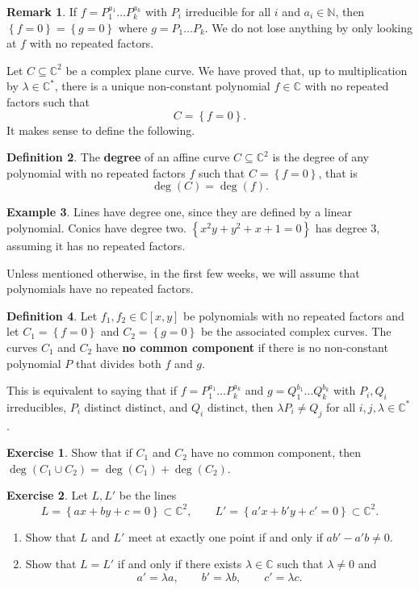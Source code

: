 \documentclass{article}
\newcommand{\N}{\mathbb{N}}
\newcommand{\C}{\mathbb{C}}
\newcommand{\rb}[1]{\left( #1 \right)}
\renewcommand{\sb}[1]{\left[ #1 \right]}
\newcommand{\cb}[1]{\left\{ #1 \right\}}
\theoremstyle{definition}\newtheorem{definition}{Definition}[section]
\theoremstyle{definition}\newtheorem{notation}[definition]{Notation}
\theoremstyle{definition}\newtheorem{remark}[definition]{Remark}
\theoremstyle{definition}\newtheorem{example}[definition]{Example}
\theoremstyle{definition}\newtheorem{fact}{Fact}
\theoremstyle{definition}\newtheorem{exercise}{Exercise}
\begin{document}
\begin{remark}
If $ f = P_1^{a_1} \dots P_k^{a_k} $ with $ P_i $ irreducible for all $ i $ and $ a_i \in \N $, then $ \cb{f = 0} = \cb{g = 0} $ where $ g = P_1 \dots P_k $. We do not lose anything by only looking at $ f $ with no repeated factors.
\end{remark}

Let $ C \subseteq \C^2 $ be a complex plane curve. We have proved that, up to multiplication by $ \lambda \in \C^* $, there is a unique non-constant polynomial $ f \in \C $ with no repeated factors such that
$$ C = \cb{f = 0}. $$
It makes sense to define the following.

\begin{definition}
The \textbf{degree} of an affine curve $ C \subseteq \C^2 $ is the degree of any polynomial with no repeated factors $ f $ such that $ C = \cb{f = 0} $, that is
$$ \deg\rb{C} = \deg\rb{f}. $$
\end{definition}

\begin{example}
Lines have degree one, since they are defined by a linear polynomial. Conics have degree two. $ \cb{x^2y + y^2 + x + 1 = 0} $ has degree 3, assuming it has no repeated factors.
\end{example}

Unless mentioned otherwise, in the first few weeks, we will assume that polynomials have no repeated factors.

\begin{definition}
Let $ f_1, f_2 \in \C\sb{x, y} $ be polynomials with no repeated factors and let $ C_1 = \cb{f = 0} $ and $ C_2 = \cb{g = 0} $ be the associated complex curves. The curves $ C_1 $ and $ C_2 $ have \textbf{no common component} if there is no non-constant polynomial $ P $ that divides both $ f $ and $ g $.
\end{definition}

This is equivalent to saying that if $ f = P_1^{a_1} \dots P_k^{a_k} $ and $ g = Q_1^{b_1} \dots Q_k^{b_k} $ with $ P_i, Q_i $ irreducibles, $ P_i $ distinct distinct, and $ Q_i $ distinct, then $ \lambda P_i \ne Q_j $ for all $ i, j, \lambda \in \C^* $.

\begin{exercise}
Show that if $ C_1 $ and $ C_2 $ have no common component, then $ \deg\rb{C_1 \cup C_2} = \deg\rb{C_1} + \deg\rb{C_2} $.
\end{exercise}

\begin{exercise}
Let $ L, L' $ be the lines
$$ L = \cb{ax + by + c = 0} \subset \C^2, \qquad L' = \cb{a'x + b'y + c' = 0} \subset \C^2. $$
\begin{enumerate}
\item Show that $ L $ and $ L' $ meet at exactly one point if and only if $ ab' - a'b \ne 0 $.
\item Show that $ L = L' $ if and only if there exists $ \lambda \in \C $ such that $ \lambda \ne 0 $ and
$$ a' = \lambda a, \qquad b' = \lambda b, \qquad c' = \lambda c. $$
\end{enumerate}
\end{exercise}
\end{document}
